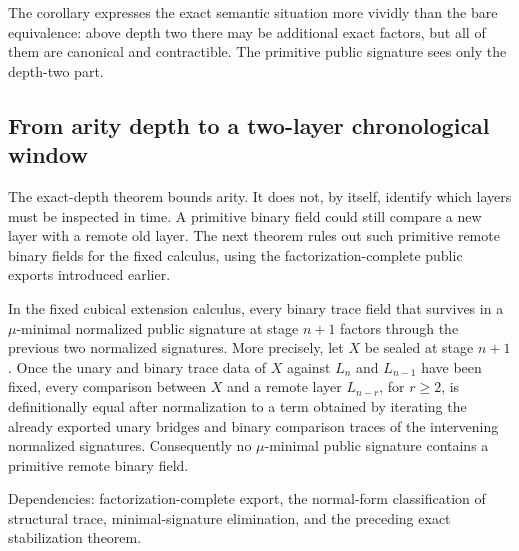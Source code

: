 \documentclass{lmcs}
\begin{document}
The corollary expresses the exact semantic situation more vividly than the bare equivalence:
above depth two there may be additional exact factors, but all of them are canonical and
contractible.  The primitive public signature sees only the depth-two part.

\subsection{From arity depth to a two-layer chronological window}
\label{subsec:recent-history}

The exact-depth theorem bounds arity.  It does not, by itself, identify which layers must be
inspected in time.  A primitive binary field could still compare a new layer with a remote
old layer.  The next theorem rules out such primitive remote binary fields for the fixed
calculus, using the factorization-complete public exports introduced earlier.

\begin{thm}
\label{thm:recent-history-factorization}
In the fixed cubical extension calculus, every binary trace field that survives in a
\(\mu\)-minimal normalized public signature at stage \(n+1\) factors through the previous two
normalized signatures.  More precisely, let \(X\) be sealed at stage \(n+1\).  Once the unary
and binary trace data of \(X\) against \(L_n\) and \(L_{n-1}\) have been fixed, every
comparison between \(X\) and a remote layer \(L_{n-r}\), for \(r\geq 2\), is
definitionally equal after normalization to a term obtained by iterating the already exported
unary bridges and binary comparison traces of the intervening normalized signatures.
Consequently no \(\mu\)-minimal public signature contains a primitive remote binary field.

Dependencies: factorization-complete export, the normal-form classification of structural
trace, minimal-signature elimination, and the preceding exact stabilization theorem.
\end{thm}
\end{document}
